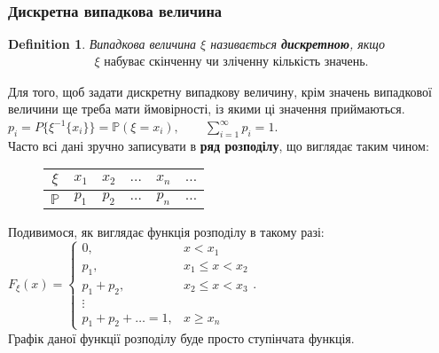 \documentclass[a4paper, 10pt]{article}
\theoremstyle{theoremdd}
\newtheorem{definition}[theorem]{Definition}
\begin{document}
\subsubsection{Дискретна випадкова величина}
\begin{definition}
Випадкова величина $\xi$ називається \textbf{дискретною}, якщо
\begin{align*}
\xi \text{ набуває скінченну чи зліченну кількість значень.}
\end{align*}
\end{definition}
\noindent Для того, щоб задати дискретну випадкову величину, крім значень випадкової величини ще треба мати ймовірності, із якими ці значення приймаються.\\
$p_i = P\{\xi^{-1}\{x_i\}\} = \mathbb{P}(\xi = x_i), \qquad \displaystyle\sum_{i=1}^\infty p_i = 1$.
\bigskip \\
Часто всі дані зручно записувати в \textbf{ряд розподілу}, що виглядає таким чином:
\begin{figure}[H]
\centering
\begin{tabular}{c|c|c|c|c|c}
$\xi$ & $x_1$ & $x_2$ & $\dots$ & $x_n$ & $\dots$ \\
\hline
$\mathbb{P}$ & $p_1$ & $p_2$ & $\dots$ & $p_n$ & $\dots$
\end{tabular}
\end{figure}
\noindent
Подивимося, як виглядає функція розподілу в такому разі:\\
$F_\xi(x) = \begin{cases}
0, & x < x_1 \\
p_1, & x_1 \leq x < x_2 \\
p_1 + p_2, & x_2 \leq x < x_3 \\
\vdots \\
p_1 + p_2 + \dots = 1, & x \geq x_n
\end{cases}$.\\
Графік даної функції розподілу буде просто ступінчата функція.
\end{document}
